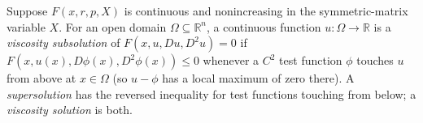 
Suppose $F(x,r,p,X)$ is continuous and nonincreasing in the symmetric-matrix variable $X$. For an open domain $\Omega\subseteq\mathbb R^n$, a continuous function $u:\Omega\to\mathbb R$ is a \emph{viscosity subsolution} of $F(x,u,Du,D^2u)=0$ if $F(x,u(x),D\phi(x),D^2\phi(x))\le0$ whenever a $C^2$ test function $\phi$ touches $u$ from above at $x\in\Omega$ (so $u-\phi$ has a local maximum of zero there). A \emph{supersolution} has the reversed inequality for test functions touching from below; a \emph{viscosity solution} is both.
